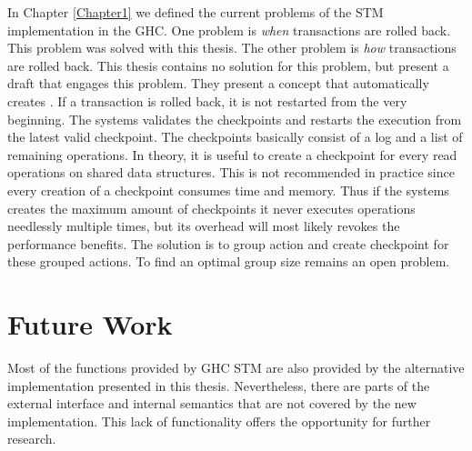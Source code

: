 In Chapter \ref{Chapter1} we defined the current problems of the STM implementation in the GHC. One problem
is \textit{when} transactions are rolled back. This problem was solved with this thesis. The other problem is
\textit{how} transactions are rolled back. This thesis contains no solution for this problem, but \parencite{checkpoint}
present a draft that engages this problem. They present a concept that automatically creates 
. If a transaction is rolled back, it is not restarted from the very beginning. The 
systems validates the checkpoints and restarts the execution from the latest valid checkpoint.
The checkpoints basically consist of a log and a list of remaining operations. In theory, it is useful
to create a checkpoint for every read operations on shared data structures. This is not recommended in practice since
every creation of a checkpoint consumes time and memory. Thus if the systems creates the maximum amount 
of checkpoints it never executes operations needlessly multiple times, but its overhead will
most likely revokes the performance benefits. The solution is to group action and create checkpoint 
for these grouped actions. To find an optimal group size remains an open problem.

\section{Future Work}
Most of the functions provided by GHC STM are also provided by the alternative implementation presented in
this thesis. Nevertheless, there are parts of the external interface and internal semantics that are not 
covered by the new implementation. This lack of functionality offers the opportunity for further research.

